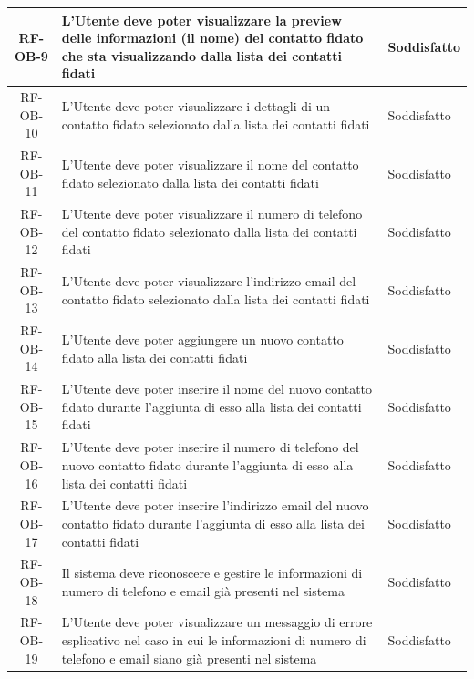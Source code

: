 \documentclass[a4paper,12pt]{article}
\begin{document}
\begin{center}
\begin{longtable}{|c|p{8.5cm}|>{\centering\arraybackslash}p{4cm}|}
RF-OB-9 & L'Utente deve poter visualizzare la preview delle informazioni (il nome) del contatto fidato che sta visualizzando dalla lista dei contatti fidati & Soddisfatto \\
\hline

RF-OB-10 & L'Utente deve poter visualizzare i dettagli di un contatto fidato selezionato dalla lista dei contatti fidati & Soddisfatto \\
\hline

RF-OB-11 & L'Utente deve poter visualizzare il nome del contatto fidato selezionato dalla lista dei contatti fidati & Soddisfatto \\
\hline

RF-OB-12 & L'Utente deve poter visualizzare il numero di telefono del contatto fidato selezionato dalla lista dei contatti fidati & Soddisfatto \\
\hline

RF-OB-13 & L'Utente deve poter visualizzare l'indirizzo email del contatto fidato selezionato dalla lista dei contatti fidati & Soddisfatto \\
\hline

RF-OB-14 & L'Utente deve poter aggiungere un nuovo contatto fidato alla lista dei contatti fidati & Soddisfatto \\
\hline

RF-OB-15 & L'Utente deve poter inserire il nome del nuovo contatto fidato durante l'aggiunta di esso alla lista dei contatti fidati & Soddisfatto \\
\hline

RF-OB-16 & L'Utente deve poter inserire il numero di telefono del nuovo contatto fidato durante l'aggiunta di esso alla lista dei contatti fidati & Soddisfatto \\
\hline

RF-OB-17 & L'Utente deve poter inserire l'indirizzo email del nuovo contatto fidato durante l'aggiunta di esso alla lista dei contatti fidati & Soddisfatto \\
\hline

RF-OB-18 & Il sistema deve riconoscere e gestire le informazioni di numero di telefono e email già presenti nel sistema & Soddisfatto \\
\hline

RF-OB-19 & L'Utente deve poter visualizzare un messaggio di errore esplicativo nel caso in cui le informazioni di numero di telefono e email siano già presenti nel sistema & Soddisfatto \\
\hline


\end{longtable}
\end{center}
\end{document}
